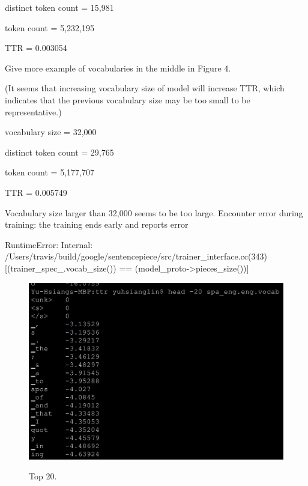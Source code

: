 \documentclass{article}
\begin{document}
distinct token count = 15,981

token count = 5,232,195

TTR = 0.003054

Give more example of vocabularies in the middle in Figure 4.

(It seems that increasing vocabulary size of model will increase TTR, which indicates that the previous vocabulary size may be too small to be representative.)

vocabulary size = 32,000

distinct token count = 29,765

token count = 5,177,707

TTR = 0.005749

Vocabulary size larger than 32,000 seems to be too large. Encounter error during training: the training ends early and reports error

RuntimeError: Internal: /Users/travis/build/google/sentencepiece/src/trainer\_interface.cc(343) [(trainer\_spec\_.vocab\_size()) == (model\_proto->pieces\_size())]









\clearpage

\begin{figure}
\center
\includegraphics[width=12cm]{vocab1.png}\\
\caption{Top 20.}
\end{figure}
\end{document}
